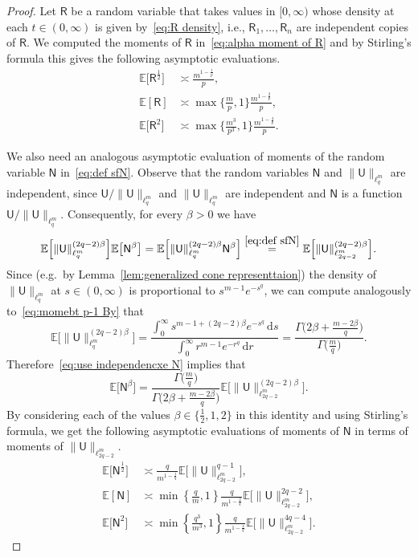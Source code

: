 \documentclass[11pt,reqno]{amsart}
\newcommand{\ud}[0]{\,\mathrm{d}}
\theoremstyle{remark}
\newcommand{\E}{\mathbb{ E}}
\renewcommand{\1}{\mathbf 1}
\newcommand{\RR}{\mathsf{R}}
\newcommand{\sfU}{\mathsf{U}}
\newcommand{\sfN}{\mathsf{N}}
\begin{document}
\begin{proof}
Let $\RR$ be a random variable that takes values in $[0,\infty)$ whose density at each $t\in (0,\infty)$ is given by~\eqref{eq:R density}, i.e., $\RR_1,\ldots,\RR_n$ are independent copies of $\RR$. We computed the moments of $\RR$ in~\eqref{eq:alpha moment of R} and by Stirling's formula this gives the following asymptotic evaluations.
\begin{align}
\E\big[\RR^\frac12\big]&\asymp \frac{m^{1-\frac{1}{p}}}{p},\label{eq:moment of R1/2}\\\E[\RR]&\asymp \max\Big\{\frac{m}{p},1\Big\}\frac{m^{1-\frac{2}{p}}}{p}, \label{eq:moment of R1}\\ \E\big[\RR^2\big] &\asymp \max\Big\{\frac{m^3}{p^3},1\Big\}\frac{m^{1-\frac{4}{p}}}{p}\label{eq:moment of R2}.
\end{align}

We  also need an analogous asymptotic evaluation of moments of the random variable $\sfN$ in~\eqref{eq:def sfN}.  Observe that the random variables $\sfN$ and $\|\sfU\|_{\ell_q^m}$ are independent, since $\sfU/\|\sfU\|_{\ell_q^m}$ and $\|\sfU\|_{\ell_q^m}$ are independent and $\sfN$ is a function $\sfU/\|\sfU\|_{\ell_q^m}$. Consequently, for every  $\beta>0$ we have
\begin{equation}\label{eq:use independencxe N}
\E\Big[\|\sfU\|_{\ell_q^m}^{(2q-2)\beta}\Big]\E \big[\sfN^\beta\big]=\E\Big[\|\sfU\|_{\ell_q^m}^{(2q-2)\beta}\sfN^\beta\Big]\stackrel{\eqref{eq:def sfN}}{=}\E\Big[\|\sfU\|_{\ell_{2q-2}^m}^{(2q-2)\beta}\Big].
\end{equation}
Since (e.g.~by Lemma~\ref{lem:generalized cone representtaion}) the density of $\|\sfU\|_{\ell_q^m}$ at $s\in (0,\infty)$ is proportional to $s^{m-1}e^{-s^q}$, we can compute analogously to~\eqref{eq:momebt p-1 By} that
$$
\E\Big[\|\sfU\|_{\ell_q^m}^{(2q-2)\beta}\Big]=\frac{\int_0^\infty s^{m-1+(2q-2)\beta}e^{-s^q}\ud s}{\int_0^\infty r^{m-1}e^{-r^q}\ud r}=\frac{\Gamma\big(2\beta+\frac{m-2\beta}{q}\big)}{\Gamma\big(\frac{m}{q}\big)}.
$$
Therefore~\eqref{eq:use independencxe N} implies that
\begin{equation*}
\E \big[\sfN^\beta\big]=\frac{\Gamma\big(\frac{m}{q}\big)}{\Gamma\big(2\beta+\frac{m-2\beta}{q}\big)}\E\Big[\|\sfU\|_{\ell_{2q-2}^m}^{(2q-2)\beta}\Big].
\end{equation*}
By considering each of the values $\beta\in \{\frac12,1,2\}$ in this identity and using Stirling's formula, we get the following asymptotic evaluations of moments of $\sfN$ in terms of moments of $\|\sfU\|_{\ell_{2q-2}^m}$.
\begin{align}
\E \big[\sfN^\frac12\big]&\asymp\frac{q}{m^{1-\frac{1}{q}}}\E\Big[\|\sfU\|_{\ell_{2q-2}^m}^{q-1}\Big],\label{eq:N1/2}\\
 \E[\sfN]&\asymp \min\left\{\frac{q}{m},1\right\}\frac{q}{m^{1-\frac{2}{q}}}\E\Big[\|\sfU\|_{\ell_{2q-2}^m}^{2q-2}\Big],
\label{eq:N1}\\
\E\big[\sfN^2\big]&\asymp \min\left\{\frac{q^3}{m^3},1\right\}\frac{q}{m^{1-\frac{4}{q}}}\E\Big[\|\sfU\|_{\ell_{2q-2}^m}^{4q-4}\Big].\label{eq:N2}
\end{align}



\end{proof}
\end{document}
